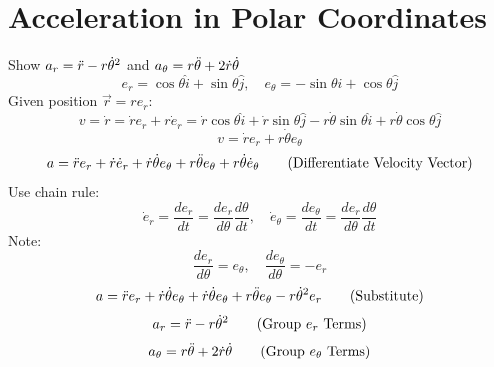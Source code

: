 \documentclass[aps,twocolumn]{revtex4-1}
\begin{document}
\section{Acceleration in Polar Coordinates}
Show $a_r = \Ddot{r}-r\dot{\theta}^2$ and $a_\theta = r\Ddot \theta + 2\dot r \dot \theta$
\begin{equation*}
    e_r = \cos{\theta} \hat{i} + \sin{\theta}\hat{j},   \quad  
    e_\theta = -\sin{\theta}\hat{i} + \cos{\theta}\hat{j}
 \tag{Define Standard Unit Vectors}
\end{equation*}
Given position $\Vec{r} = re_r$:
\begin{equation*}
    v = \dot r = \dot r e_r  + r \dot e_r = \dot r\cos{\theta} \hat{i} + \dot r\sin{\theta}\hat{j} - r \dot \theta \sin{\theta}\hat{i} + r\dot \theta \cos{\theta}\hat{j} \tag{Differentiate Position Vector}
\end{equation*}
\begin{equation*}
    v = \dot r e_r + r\dot \theta e_\theta \tag{Simplify}
\end{equation*}
\begin{equation*}
    a = \Ddot r e_r + \dot r \dot e_r + \dot r \dot \theta e_\theta + r \Ddot{\theta} e_\theta + r \dot \theta \dot e_\theta \tag{Differentiate Velocity Vector}
\end{equation*}
Use chain rule:
\begin{equation*}
\dot e_r = \frac{de_r}{dt} = \frac{de_r}{d\theta}\frac{d\theta}{dt}, \quad \dot e_\theta = \frac{de_\theta}{dt} = \frac{de_r}{d\theta}\frac{d\theta}{dt}
\end{equation*}
Note:
\begin{equation*}
    \frac{de_r}{d\theta} = e_\theta, \quad \frac{de_\theta}{d\theta} = -e_r
\end{equation*}
\begin{equation*}
    a = \Ddot{r} e_r + \dot r \dot \theta e_\theta + \dot r \dot \theta e_\theta + r \Ddot \theta e_\theta - r \dot \theta^2 e_r \tag{Substitute}
\end{equation*}
\begin{equation*}
    a_r = \Ddot r - r\dot \theta^2 \tag{Group $e_r$ Terms}
\end{equation*}
\begin{equation*}
    a_\theta = r\Ddot \theta + 2\dot r \dot \theta \tag{Group $e_\theta$ Terms}
\end{equation*}
\end{document}
